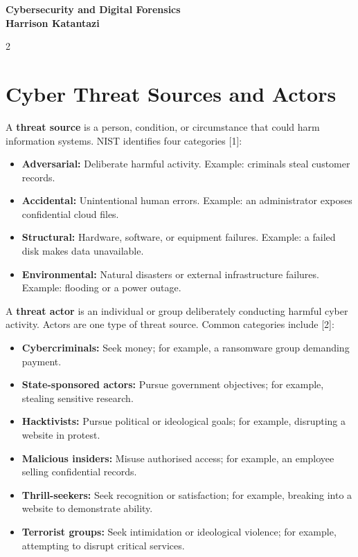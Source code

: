 \documentclass[11pt,a4paper]{article}
\begin{document}
\begin{center}
{\Large\bfseries Cybersecurity and Digital Forensics}\\[2pt]
{\large\bfseries Harrison Katantazi}
\end{center}
\vspace{-6pt}

\begin{multicols}{2}
\raggedcolumns

\section{Cyber Threat Sources and Actors}

A \textbf{threat source} is a person, condition, or circumstance
that could harm information systems. NIST identifies four
categories [1]:
\begin{itemize}
\item \textbf{Adversarial:} Deliberate harmful activity.
Example: criminals steal customer records.
\item \textbf{Accidental:} Unintentional human errors.
Example: an administrator exposes confidential cloud files.
\item \textbf{Structural:} Hardware, software, or equipment
failures. Example: a failed disk makes data unavailable.
\item \textbf{Environmental:} Natural disasters or external
infrastructure failures. Example: flooding or a power outage.
\end{itemize}

A \textbf{threat actor} is an individual or group deliberately
conducting harmful cyber activity. Actors are one type of
threat source. Common categories include [2]:
\begin{itemize}
\item \textbf{Cybercriminals:} Seek money; for example,
a ransomware group demanding payment.
\item \textbf{State-sponsored actors:} Pursue government
objectives; for example, stealing sensitive research.
\item \textbf{Hacktivists:} Pursue political or ideological
goals; for example, disrupting a website in protest.
\item \textbf{Malicious insiders:} Misuse authorised access;
for example, an employee selling confidential records.
\item \textbf{Thrill-seekers:} Seek recognition or satisfaction;
for example, breaking into a website to demonstrate ability.
\item \textbf{Terrorist groups:} Seek intimidation or ideological
violence; for example, attempting to disrupt critical services.
\end{itemize}


\end{multicols}
\end{document}
